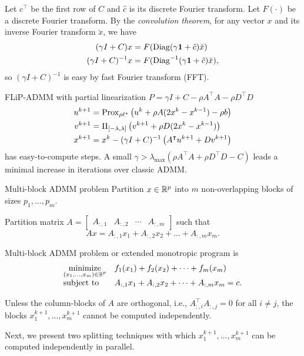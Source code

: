 \documentclass[10pt,mathserif]{beamer}
\begin{document}
\begin{frame}

Let $c^\intercal$ be the first row of $C$ and $\hat{c}$ is its discrete Fourier transform. Let $F(\cdot)$ be a discrete Fourier transform. By the \emph{convolution theorem}, for any vector $x$ and its inverse Fourier transform $\breve{x}$, we have
\begin{align*}
(\gamma I + C)x & = F(\mathrm{Diag}(\gamma {\mathbf{1}} + \hat{c})\breve{x})\\
(\gamma I + C)^{-1}x & = F(\mathrm{Diag}^{-1}(\gamma {\mathbf{1}} + \hat{c})\breve{x}),
\end{align*}
so $(\gamma I + C)^{-1}$ is easy by fast Fourier transform (FFT).
\medskip

FLiP-ADMM with partial linearization $P=\gamma I + C - \rho A^\intercal  A - \rho D^\intercal  D$
\begin{align*}
u^{k+1}&=\mathrm{Prox}_{\rho \ell^*}\left(u^k+\rho A(2x^k-x^{k-1})-\rho b\right)\\
v^{k+1}&=\Pi_{[-\lambda,\lambda]}\left(v^{k+1}+\rho D(2x^k-x^{k-1})\right)\\
x^{k+1}&=x^k-(\gamma I+C)^{-1}\left(A^\intercal  u^{k+1}+ D v^{k+1}\right)
\end{align*}
has easy-to-compute steps. A small $\gamma > \lambda_{\max}(\rho A^\intercal  A + \rho D^\intercal  D - C)$ leads a minimal increase in iterations over classic ADMM.
\end{frame}

\begin{frame}{Multi-block ADMM problem}
Partition $x\in \mathbb{R}^p$ into $m$ non-overlapping blocks of sizes $p_1,\dots,p_m$. 
\medskip

Partition matrix $A=
\begin{bmatrix}
A_{:,1}&A_{:,2}&\cdots &A_{:,m}
\end{bmatrix}
$
such that 
\[
Ax=A_{:,1}x_1+A_{:,2}x_2+\dots +A_{:,m}x_m.
\]

Multi-block ADMM problem or extended monotropic program is
\begin{equation}
\begin{array}{ll}
\underset{\substack{(x_1,\dots,x_m)\in \mathbb{R}^p}}{\mbox{minimize}}&
\displaystyle{f_1(x_1) + f_2(x_2)+ \dots + f_m(x_m)}
\\
\mbox{subject to}&A_{:,1}x_1+A_{:,2}x_2+\dots +A_{:,m}x_m=c.
\end{array}
\label{eq:block_split_problem}
\end{equation}

Unless the column-blocks of $A$ are orthogonal, i.e., $A^\intercal _{:,i}A_{:,j}=0$ for all $i\ne j$, the blocks $x_1^{k+1},\dots,x_m^{k+1}$ cannot be computed independently.
\medskip

Next, we present two splitting techniques with which $x_1^{k+1},\dots,x_m^{k+1}$ can be computed independently in parallel.
\end{frame}
\end{document}
